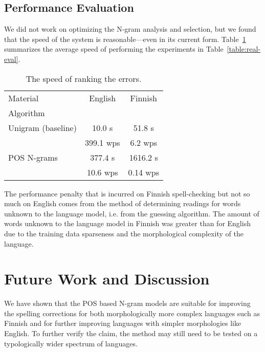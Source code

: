 \documentclass{llncs}
\begin{document}
\subsection{Performance Evaluation}

We did not work on optimizing the N-gram analysis and selection,
but we found that the speed of the system is reasonable---even in its current
form. Table~\ref{table:speed-eval} summarizes the average
speed of performing the experiments in Table~\ref{table:real-eval}.

\begin{table}
    \caption{The speed of ranking the errors.
    \label{table:speed-eval}}
  \begin{center}
      \begin{tabular}{lcc}
        \hline
        Material  & English &  Finnish \\
        Algorithm &         &          \\
        \hline
        Unigram (baseline)
 & 10.0 s    & 51.8 s  \\
 & 399.1 wps & 6.2 wps \\
        \hline
        POS N-grams 
 &   377.4 s & 1616.2 s \\
 & 10.6  wps & 0.14 wps \\
        \hline
      \end{tabular}
  \end{center}
\end{table}

The performance penalty that is incurred on Finnish spell-checking but not so
much on English comes from the method of determining readings for words unknown
to the language model, i.e. from the guessing algorithm. The amount of words
unknown to the language model in Finnish was greater than for English due to
the training data sparseness and the morphological complexity of the language.

\section{Future Work and Discussion}
\label{sec:future-work}

We have shown that the POS based N-gram models are suitable for improving the
spelling corrections for both morphologically more complex languages such as
Finnish and for further improving languages with simpler morphologies like
English. To further verify the claim, the method may still need to be tested on
a typologically wider spectrum of languages.
\end{document}
